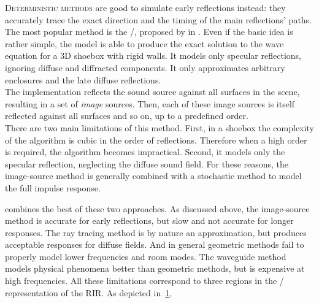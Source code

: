 \mynewline
\textsc{Deterministic methods} are good to simulate early reflections instead:
they accurately trace the exact direction and the timing of the main reflections' paths.
The most popular method is the \ISMdef/, proposed by \citeauthor{allen1979image} in .
Even if the basic idea is rather simple, the model is able to produce the exact solution to the wave equation for a 3D shoebox with rigid walls.
It models only specular reflections, ignoring diffuse and diffracted components.
It only approximates arbitrary enclosures and the late diffuse reflections.
\\The implementation reflects the sound source against all surfaces in the scene, resulting in a set of \textit{image} sources.
Then, each of these image sources is itself reflected against all surfaces and so on, up to a predefined order.
\\There are two main limitations of this method.
First, in a shoebox the complexity of the algorithm is cubic in the order of reflections.
Therefore when a high order is required, the algorithm becomes impractical.
Second, it models only the specular reflection, neglecting the diffuse sound field.
For these reasons, the image-source method is generally combined with a stochastic method to model the full impulse response.

 combines the best of these two approaches.
As discussed above, the image-source method is accurate for early reflections, but slow and not accurate for longer responses.
The ray tracing method is by nature an approximation, but produces acceptable responses for diffuse fields.
And in general geometric methods fail to properly model lower frequencies and room modes.
The waveguide method models physical phenomena better than geometric methods, but is expensive at high frequencies.
All these limitations correspond to three regions in the \TFdef/ representation of the \ac{RIR}.
As depicted in~\cref{fig:acoustics:rir_regions},

\begin{figure}[t]
    \begin{fullwidth}

        \resizebox{\linewidth}{!}{
            
            }
            \label{fig:acoustics:rir_regions}
    \end{fullwidth}
\end{figure}

